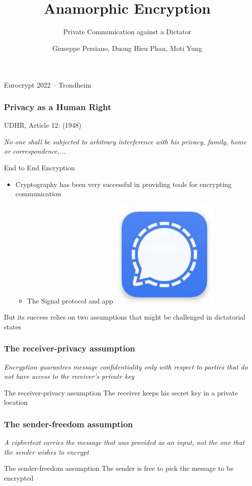 \documentclass[handout]{beamer}
\title[Anamorphic]{Anamorphic Encryption}
\subtitle{Private Communication against a Dictator}
\author{Giuseppe Persiano, Duong Hieu Phan, Moti Yung}
\date{}
\begin{document}
\begin{frame}
  \titlepage


Eurocrypt 2022 -- Trondheim 
\end{frame}


\begin{frame}
\frametitle{Privacy as a Human Right}

UDHR, Article 12: (1948)

{\color{brown}
{\em No one shall be subjected to arbitrary interference with his privacy, family, home or correspondence,...}
}

\pause
\vskip 1cm
\begin{block}{End to End Encryption}
\begin{itemize}
\item Cryptography has been very successful in providing tools for
encrypting communication
\begin{itemize}
\item The Signal protocol and app \hfill \includegraphics[width=.5cm]{imgs/signal}
\end{itemize}
\end{itemize}
\end{block}

\pause
\vfill
But its success relies on two assumptions that might be challenged in dictatorial
states
\end{frame}

\begin{frame}
\frametitle{The receiver-privacy assumption}

{\color{brown} \em 
Encryption guarantees message confidentiality only with respect to 
parties that do not have access to  the receiver's private key
}

\vfill


\begin{block}{The receiver-privacy assumption}
The receiver keeps his secret key in a private location
\end{block}

\end{frame}

\begin{frame}
\frametitle{The sender-freedom assumption}

{\color{brown} \em 
A ciphertext carries the message that was provided as an input,
not the one that the sender wishes to encrypt
}

\vfill

\begin{block}{The sender-freedom assumption}
The sender is free to pick the message to be encrypted
\end{block}
\end{frame}
\end{document}
